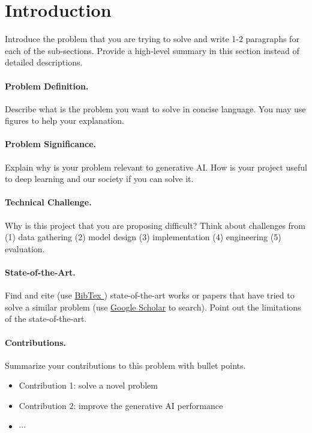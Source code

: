 \documentclass{article}
\begin{document}
\section{Introduction}
Introduce the problem that you are trying to solve and write 1-2
paragraphs for each of the sub-sections. Provide a high-level
summary in this section instead of detailed descriptions.

\paragraph{Problem Definition.}
Describe  what is the problem you want to solve in concise language.
You may use figures to help your explanation.

\paragraph{Problem Significance.}
Explain  why is your problem relevant to generative AI. How is your
project useful to deep learning and our society if you can solve it.

\paragraph{Technical Challenge.}
Why is this project that you are proposing difficult? Think about
challenges from (1) data gathering (2) model design (3)
implementation (4) engineering (5) evaluation.

\paragraph{State-of-the-Art.}
Find and cite (use
  \href{https://www.overleaf.com/learn/latex/Bibliography_management_with_bibtex}{BibTex
}) state-of-the-art works or papers that have tried to solve a
similar problem (use \href{https://scholar.google.com/}{Google
Scholar} to search). Point out the limitations of the state-of-the-art.

\paragraph{Contributions.}
Summarize your contributions to this problem with bullet points.
\begin{itemize}
  \item Contribution 1: solve a novel problem
  \item Contribution 2: improve the generative AI performance
  \item $\cdots$
\end{itemize}
\end{document}
